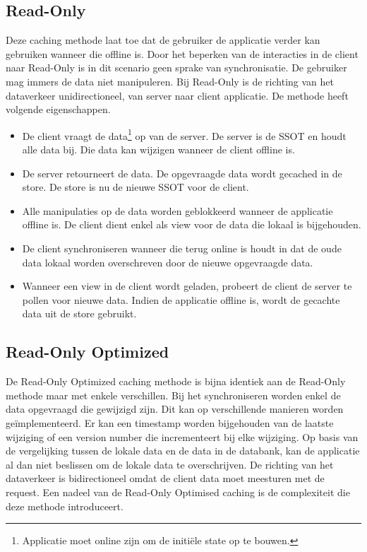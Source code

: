 \subsection{Read-Only}
Deze caching methode laat toe dat de gebruiker de applicatie verder kan gebruiken wanneer die offline is. Door het beperken van de interacties in de client naar Read-Only is in dit scenario geen sprake van synchronisatie. De gebruiker mag immers de data niet manipuleren. Bij Read-Only is de richting van het dataverkeer unidirectioneel, van server naar client applicatie. De methode heeft volgende eigenschappen.
\begin{itemize}
\item De client vraagt de data\footnote{Applicatie moet online zijn om de initi\"ele state op te bouwen.} op van de server. De server is de SSOT en houdt alle data bij. Die data kan wijzigen wanneer de client offline is.
\item De server retourneert de data. De opgevraagde data wordt gecached in de store. De store is nu de nieuwe SSOT voor de client.
\item Alle manipulaties op de data worden geblokkeerd wanneer de applicatie offline is. De client dient enkel als view voor de data die lokaal is bijgehouden.
\item De client synchroniseren wanneer die terug online is houdt in dat de oude data lokaal worden overschreven door de nieuwe opgevraagde data.
\item Wanneer een view in de client wordt geladen, probeert de client de server te pollen voor nieuwe data. Indien de applicatie offline is, wordt de gecachte data uit de store gebruikt.
\end{itemize}

\subsection{Read-Only Optimized}
De Read-Only Optimized caching methode is  bijna identiek aan de Read-Only methode maar met enkele verschillen. Bij het synchroniseren worden enkel de data opgevraagd die gewijzigd zijn. Dit kan op verschillende manieren worden ge\"implementeerd. Er kan een timestamp worden bijgehouden van de laatste wijziging of een version number die incrementeert bij elke wijziging. Op basis van de vergelijking tussen de lokale data en de data in de databank, kan de applicatie al dan niet beslissen om de lokale data te overschrijven. De richting van het dataverkeer is bidirectioneel omdat de client data moet meesturen met de request. Een nadeel van de Read-Only Optimised caching is de complexiteit die deze methode introduceert.

